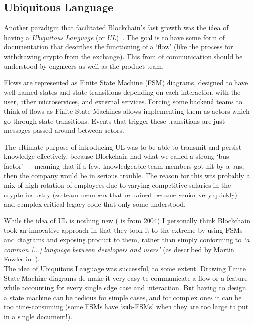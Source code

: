 \documentclass[conference]{IEEEtran}
\begin{document}
    \subsection{Ubiquitous Language}\label{subsec:ul}

    Another paradigm that facilitated Blockchain's fast growth was the idea of having a
    \emph{Ubiquitous Language} (or \emph{UL})~\cite{evansDomainDrivenDesignUL, fowlerUL}.
    The goal is to have some form of documentation that describes the functioning of a `flow' (like
    the process for withdrawing crypto from the exchange).
    This from of communication should be understood by engineers as well as the product team.

    Flows are represented as Finite State Machine (FSM) diagrams, designed to have well-named states and
    state transitions depending on each interaction with the user, other microservices, and external
    services.
    Forcing some backend teams to think of flows as Finite State Machines allows implementing
    them as actors which go through state transitions.
    Events that trigger these transitions are just messages passed around between actors.

    The ultimate purpose of introducing UL was to be able to transmit and persist knowledge
    effectively, because Blockchain had what we called a strong `bus
    factor'~\cite{bowlerTruckFactor} -- meaning that if a few, knowledgeable team members got hit by
    a bus, then the company would be in serious trouble.
    The reason for this was probably a mix of high rotation of employees due to varying competitive
    salaries in the crypto industry (so team members that remained became senior very quickly) and
    complex critical legacy code that only some understood.

    While the idea of UL is nothing new (\cite{evansDomainDrivenDesignUL} is from 2004) I personally
    think Blockchain took an innovative approach in that they took it to the extreme by using FSMs
    and diagrams and exposing product to them, rather than simply conforming to \emph{`a common [...]
    language between developers and users'} (as described by Martin Fowler in~\cite{fowlerUL}).\\

    The idea of Ubiquitous Language was successful, to some extent.
    Drawing Finite State Machine diagrams do make it very easy to communicate a flow or a feature while
    accounting for every single edge case and interaction.
    But having to design a state machine can be tedious for simple cases, and
    for complex ones it can be too time-consuming (some FSMs have `sub-FSMs' when they are too large
    to put in a single document!).
\end{document}
